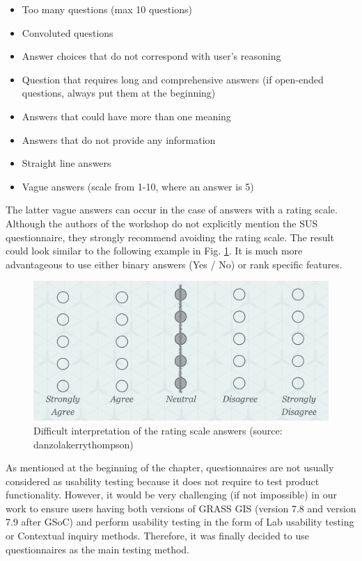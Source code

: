 \documentclass[a4paper,10pt,twoside]{article}
\begin{document}
\begin{itemize}
\item Too many questions (max 10 questions)
\item Convoluted questions
\item Answer choices that do not correspond with user's reasoning
\item Question that requires long and comprehensive answers (if open-ended questions, always put them at the beginning)
\item Answers that could have more than one meaning
\item Answers that do not provide any information
\item Straight line answers
\item Vague answers (scale from 1-10, where an answer is 5)
\end{itemize}

\noindent The latter vague answers can occur in the case of answers with a rating scale. Although the authors of the workshop do not explicitly mention the SUS questionnaire, they strongly recommend avoiding the rating scale. The result could look similar to the following example in Fig. \ref{fig:blur_scale}. It is much more advantageous to use either binary answers (Yes / No) or rank specific features.

\vspace{0.3cm}
\begin{figure}[hbt!] 
\begin{center}
\includegraphics[width=12.5cm]{../pictures/blur_scale.png} 
\caption[Difficult interpretation of the rating scale answers]{Difficult interpretation of the rating scale answers (source: danzolakerrythompson)}
\label{fig:blur_scale}
\end{center}
\end{figure}

\noindent As mentioned at the beginning of the chapter, questionnaires are not usually considered as usability testing because it does not require to test product functionality. However, it would be very challenging (if not impossible) in our work to ensure users having both versions of GRASS GIS (version 7.8 and version 7.9 after GSoC) and perform usability testing in the form of Lab usability testing or Contextual inquiry methods. Therefore, it was finally decided to use questionnaires as the main testing method.
\end{document}
